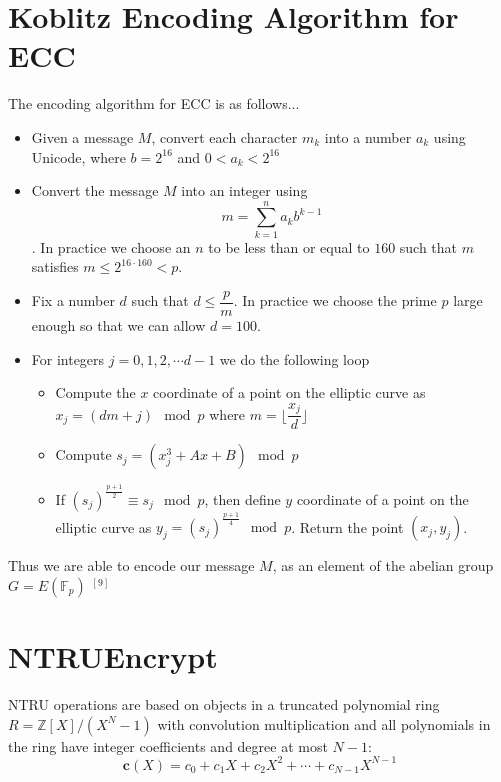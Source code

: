 \documentclass[a4paper,12pt]{article}
\begin{document}
\section{Koblitz Encoding Algorithm for ECC}
\begin{flushleft}
	The encoding algorithm for ECC is as follows...\\
	\begin{itemize}
		\item Given a message $M$, convert each character $m_k$ into a number $a_k$ using Unicode, where $b=2^{16}$ and $0<a_k<2^{16}$
		\item Convert the message $M$ into an integer using $$m=\sum_{k=1}^n a_kb^{k-1}$$. In practice we choose an $n$ to be less than or equal to $160$ such that $m$ satisfies $m\le 2^{16\cdot 160}<p$.
		\item Fix a number $d$ such that $d\le \dfrac{p}{m}$. In practice we choose the prime $p$ large enough so that we can allow $d=100$.
		\item For integers $j=0,1,2,\cdots d-1$  we do the following loop
		\begin{itemize}
			\item Compute the $x$ coordinate of a point on the elliptic curve as $x_j=(dm+j)\mod p$ where $m=\bigg\lfloor{\dfrac{x_j}{d}}\bigg\rfloor$
			\item Compute $s_j=(x_j^3+Ax+B)\mod p$
			\item If $\left(s_j\right)^{\frac{p+1}{2}}\equiv s_j\mod p$, then define $y$ coordinate of a point on the elliptic curve as $y_j=\left(s_j\right)^{\frac{p+1}{4}}\mod p$. Return the point $(x_j,y_j)$.
		\end{itemize}
	\end{itemize}
	
	Thus we are able to encode our message $M$, as an element of the abelian group $G=E\left(\mathbb{F}_p\right)$ $^{[9]}$
\end{flushleft}

\section{NTRUEncrypt}
NTRU operations are based on objects in a truncated polynomial ring $R=\mathbb{Z}[X]/(X^N-1)$ with convolution multiplication and all polynomials in the ring have integer coefficients and degree at most $N-1$:
\begin{equation}
    \textbf{c}(X)=c_0+c_1X+c_2X^2+\cdots+c_{N-1}X^{N-1}
\end{equation}
\end{document}
